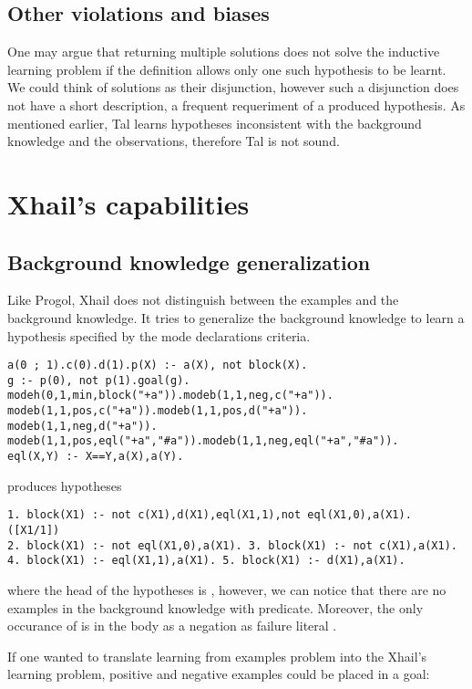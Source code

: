 \subsection{Other violations and biases}
One may argue that returning multiple solutions does not solve the inductive learning problem if the definition allows only one such hypothesis to be learnt. We could think of solutions as their disjunction, however such a disjunction does not have a short description, a frequent requeriment of a produced hypothesis. As mentioned earlier, Tal learns hypotheses inconsistent with the background knowledge and the observations, therefore Tal is not sound.

\section{Xhail's capabilities}

\subsection{Background knowledge generalization}
Like Progol, Xhail does not distinguish between the examples and the background knowledge. It tries to generalize the background knowledge to learn a hypothesis specified by the mode declarations criteria.

\begin{lstlisting}
a(0 ; 1).c(0).d(1).p(X) :- a(X), not block(X).
g :- p(0), not p(1).goal(g).
modeh(0,1,min,block("+a")).modeb(1,1,neg,c("+a")).
modeb(1,1,pos,c("+a")).modeb(1,1,pos,d("+a")).
modeb(1,1,neg,d("+a")).
modeb(1,1,pos,eql("+a","#a")).modeb(1,1,neg,eql("+a","#a")).
eql(X,Y) :- X==Y,a(X),a(Y).
\end{lstlisting}
produces hypotheses
\begin{lstlisting}
1. block(X1) :- not c(X1),d(X1),eql(X1,1),not eql(X1,0),a(X1). ([X1/1])
2. block(X1) :- not eql(X1,0),a(X1). 3. block(X1) :- not c(X1),a(X1).
4. block(X1) :- eql(X1,1),a(X1). 5. block(X1) :- d(X1),a(X1).
\end{lstlisting}
where the head of the hypotheses is , however, we can notice that there are no examples in the background knowledge with  predicate. Moreover, the only occurance of  is in the body as a negation as failure literal .

If one wanted to translate learning from examples problem into the Xhail's learning problem, positive and negative examples could be placed in a goal:

